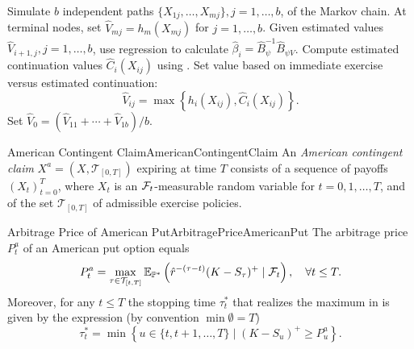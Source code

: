 \begin{algorithm}[H]
	\caption{Regression-Based Pricing Algorithm}\label{alg:GeneralRegressionPricing}
	\begin{algorithmic}[1]
		\State{} Simulate \(b\) independent paths \(\{X_{1j}, \dots, X_{mj}\}, j = 1, \dots, b\), of the Markov chain.
		\State{} At terminal nodes, set \(\hat{V}_{mj} = h_m(X_{mj})\) for \(j = 1, \dots, b\).
		\State{} Given estimated values \(\hat{V}_{i+1, j}, j = 1, \dots, b\), use regression to calculate \(\hat{\beta}_i = \hat{B}_\psi^{-1} \hat{B}_{\psi V}\).
		\State{} Compute estimated continuation values \(\hat{C}_i(X_{ij})\) using .
		\State{} Set value based on immediate exercise versus estimated continuation:
		\begin{equation} \label{eq:GeneralRegressionUpdate}
			\hat{V}_{ij} = \max \left\{ h_i(X_{ij}), \hat{C}_i(X_{ij}) \right\}.
		\end{equation}
		\EndFor{}
		\EndFor{}
		\State{} Set \(\hat{V}_0 = (\hat{V}_{11} + \cdots + \hat{V}_{1b}) / b\).
	\end{algorithmic}
\end{algorithm}

\begin{defn}{American Contingent Claim}{AmericanContingentClaim}
	An \textit{American contingent claim} \(X^a = (X, \mathcal{T}_{[0,T]})\) expiring at time \(T\) consists of a sequence of payoffs \((X_t)_{t=0}^T\), where \(X_t\) is an \(\mathcal{F}_t\)-measurable random variable for \(t = 0, 1, \dots, T\), and of the set \(\mathcal{T}_{[0,T]}\) of admissible exercise policies.
\end{defn}

\begin{prop}{Arbitrage Price of American Put}{ArbitragePriceAmericanPut}
	The arbitrage price \(P_t^a\) of an American put option equals
	\begin{equation} \label{eq:AmericanPutArbitragePrice}
		P_t^a = \max_{\tau \in \mathcal{T}_{[t,T]}} \mathbb{E}_{\mathbb{P}^*} \left( \hat{r}^{-(\tau-t)} (K - S_\tau)^+ \mid \mathcal{F}_t \right), \quad \forall t \le T.
	\end{equation}
	Moreover, for any \(t \le T\) the stopping time \(\tau_t^*\) that realizes the maximum in  is given by the expression (by convention \(\min \emptyset = T\))
	\begin{equation} \label{eq:OptimalStoppingTime}
		\tau_t^* = \min \left\{ u \in \{t, t + 1, \dots, T\} \mid (K - S_u)^+ \ge P_u^a \right\}.
	\end{equation}
\end{prop}

